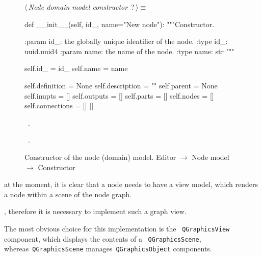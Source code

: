 \documentclass[%
    a4paper,    %
    justified,  %
    nobib,      %
    openany     %
]{tufte-book}
\makeatletter
\renewcommand{\label}[1]{\@tufte@label{##1}}%
\makeatother
\begin{document}
\begin{figure}
\begin{flushleft} \small
\begin{minipage}{\linewidth}\label{scrap67}\raggedright\small
{} $\langle\,${\itshape Node domain model constructor}\nobreak\ {\footnotesize {?}}$\,\rangle\equiv$
\vspace{-1ex}
\begin{pythoncode}
def __init__(self, id_, name="New node"):
    """Constructor.

    :param id_: the globally unique identifier of the node.
    :type  id_: uuid.uuid4
    :param name: the name of the node.
    :type  name: str
    """

    self.id_   = id_
    self.name = name

    self.definition = None
    self.description = ""
    self.parent = None
    self.inupts = []
    self.outputs = []
    self.parts = []
    self.nodes = []
    self.connections = []
|\NWsep|
\end{pythoncode}
\vspace{1.5ex}
\footnotesize
\begin{list}{}{\setlength{\itemsep}{-\parsep}\setlength{\itemindent}{-\leftmargin}}
\item \NWtxtMacroDefBy\ .
\item \NWtxtMacroRefIn\ .

\item{}
\end{list}
\end{minipage}\vspace{4ex}
\end{flushleft}
\caption{Constructor of the node (domain) model.
  \newline{}\newline{}Editor $\rightarrow$ Node model $\rightarrow$ Constructor}
\label{editor:lst:node-domain-model:constructor}
\end{figure}

 at the moment, it is
clear that a node needs to have a view model, which renders a node within a
scene of the node graph.

, therefore it is
necessary to implement such a graph view.

The most obvious choice for this implementation is the ~\verb=QGraphicsView=
component, which displays the contents of a ~\verb=QGraphicsScene=,
whereas~\verb=QGraphicsScene= manages~\verb=QGraphicsObject= components.
\end{document}
